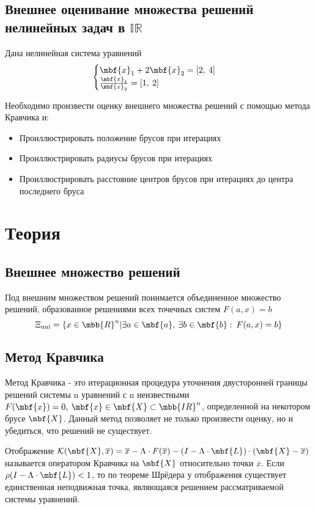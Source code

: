 \documentclass[a4paper]{article}
\begin{document}
\subsection{Внешнее оценивание множества решений нелинейных задач в $\mathbb{IR}$ }
Дана нелинейная система уравнений 
\begin{equation}\label{nelin}
    \begin{cases}
    \mbf{x}_1+2\mbf{x}_2=[2,\:4]\\
    \frac{\mbf{x}_1}{\mbf{x}_2} = [1,\:2]
    \end{cases}
\end{equation}

Необходимо произвести оценку внешнего множества решений с помощью метода Кравчика и:
\begin{itemize}
    \item Проиллюстрировать положение брусов при итерациях
    \item Проиллюстрировать радиусы брусов при итерациях
    \item Проиллюстрировать расстояние центров брусов при итерациях до центра последнего бруса
\end{itemize}
\section{Теория}
\subsection{Внешнее множество решений}
Под внешним множеством решений понимается объединенное множество решений, образованное решениями всех точечных систем $F(a,x)=b$
$$\Xi_{\mathrm{uni}}=\{x\in\mbb{R}^n|\exists a\in\mbf{a},\:\exists b\in\mbf{b}:\:F(a,x)=b\}$$
\subsection{Метод Кравчика}
Метод Кравчика - это итерационная процедура уточнения двусторонней границы решений системы n уравнений с n неизвестными $F(\mbf{x})=0,\:\mbf{x}\in\mbf{X}\subset\mbb{IR}^n$, определенной на некотором брусе $\mbf{X}$. Данный метод позволяет не только произвести оценку, но и убедиться, что решений не существует.

Отображение $\mathcal{K}(\mbf{X}, \overline{x})=\overline{x}-\Lambda\cdot F(\overline{x})-(I -\Lambda\cdot \mbf{L})\cdot(\mbf{X}-\overline{x})$ называется оператором Кравчика на $\mbf{X}$ относительно точки $\overline{x}$. Если $\rho(I -\Lambda\cdot \mbf{L})<1$, то по теореме Шрёдера у отображения существует единственная неподвижная точка, являющаяся решением рассматриваемой системы уравнений.
\end{document}
